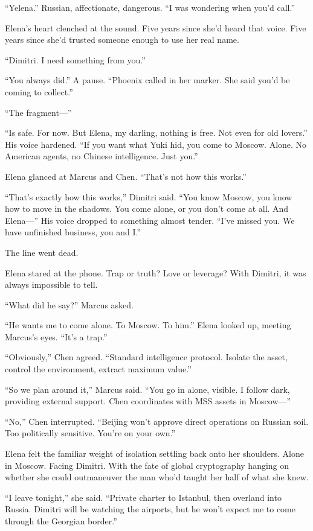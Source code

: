 ``Yelena.'' Russian, affectionate, dangerous. ``I was wondering when you'd call.''

Elena's heart clenched at the sound. Five years since she'd heard that voice. Five years since she'd trusted someone enough to use her real name.

``Dimitri. I need something from you.''

``You always did.'' A pause. ``Phoenix called in her marker. She said you'd be coming to collect.''

``The fragment---''

``Is safe. For now. But Elena, my darling, nothing is free. Not even for old lovers.'' His voice hardened. ``If you want what Yuki hid, you come to Moscow. Alone. No American agents, no Chinese intelligence. Just you.''

Elena glanced at Marcus and Chen. ``That's not how this works.''

``That's exactly how this works,'' Dimitri said. ``You know Moscow, you know how to move in the shadows. You come alone, or you don't come at all. And Elena---'' His voice dropped to something almost tender. ``I've missed you. We have unfinished business, you and I.''

The line went dead.

Elena stared at the phone. Trap or truth? Love or leverage? With Dimitri, it was always impossible to tell.

``What did he say?'' Marcus asked.

``He wants me to come alone. To Moscow. To him.'' Elena looked up, meeting Marcus's eyes. ``It's a trap.''

``Obviously,'' Chen agreed. ``Standard intelligence protocol. Isolate the asset, control the environment, extract maximum value.''

``So we plan around it,'' Marcus said. ``You go in alone, visible. I follow dark, providing external support. Chen coordinates with MSS assets in Moscow---''

``No,'' Chen interrupted. ``Beijing won't approve direct operations on Russian soil. Too politically sensitive. You're on your own.''

Elena felt the familiar weight of isolation settling back onto her shoulders. Alone in Moscow. Facing Dimitri. With the fate of global cryptography hanging on whether she could outmaneuver the man who'd taught her half of what she knew.

``I leave tonight,'' she said. ``Private charter to Istanbul, then overland into Russia. Dimitri will be watching the airports, but he won't expect me to come through the Georgian border.''

